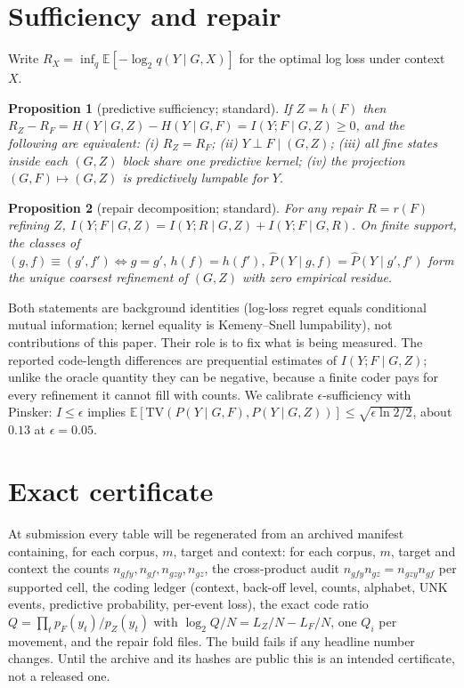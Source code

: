\documentclass[11pt]{article}
\newtheorem{proposition}{Proposition}\newtheorem{definition}{Definition}
\begin{document}
\section{Sufficiency and repair}
Write $R_X=\inf_q \mathbb E[-\log_2 q(Y\mid G,X)]$ for the optimal log loss under context $X$.
\begin{proposition}[predictive sufficiency; standard]
If $Z=h(F)$ then $R_Z-R_F = H(Y\mid G,Z)-H(Y\mid G,F) = I(Y;F\mid G,Z)\ge 0$, and the following are equivalent: (i) $R_Z=R_F$; (ii) $Y\perp F\mid (G,Z)$; (iii) all fine states inside each $(G,Z)$ block share one predictive kernel; (iv) the projection $(G,F)\mapsto(G,Z)$ is predictively lumpable for $Y$.
\end{proposition}
\begin{proposition}[repair decomposition; standard]
For any repair $R=r(F)$ refining $Z$, $I(Y;F\mid G,Z)=I(Y;R\mid G,Z)+I(Y;F\mid G,R)$. On finite support, the classes of $(g,f)\equiv(g',f')\iff g=g',\,h(f)=h(f'),\,\widehat P(Y\mid g,f)=\widehat P(Y\mid g',f')$ form the unique coarsest refinement of $(G,Z)$ with zero empirical residue.
\end{proposition}
Both statements are background identities (log-loss regret equals conditional mutual information; kernel equality is Kemeny--Snell lumpability), not contributions of this paper. Their role is to fix what is being measured. The reported code-length differences are prequential estimates of $I(Y;F\mid G,Z)$; unlike the oracle quantity they can be negative, because a finite coder pays for every refinement it cannot fill with counts. We calibrate $\epsilon$-sufficiency with Pinsker: $I\le\epsilon$ implies $\mathbb E[\mathrm{TV}(P(Y\mid G,F),P(Y\mid G,Z))]\le\sqrt{\epsilon\ln 2/2}$, about $0.13$ at $\epsilon=0.05$.

\section{Exact certificate}
At submission every table will be regenerated from an archived manifest containing, for each corpus, $m$, target and context: for each corpus, $m$, target and context the counts $n_{gfy},n_{gf},n_{gzy},n_{gz}$, the cross-product audit $n_{gfy}n_{gz}=n_{gzy}n_{gf}$ per supported cell, the coding ledger (context, back-off level, counts, alphabet, UNK events, predictive probability, per-event loss), the exact code ratio $Q=\prod_t p_F(y_t)/p_Z(y_t)$ with $\log_2Q/N=L_Z/N-L_F/N$, one $Q_i$ per movement, and the repair fold files. The build fails if any headline number changes. Until the archive and its hashes are public this is an intended certificate, not a released one.
\end{document}
